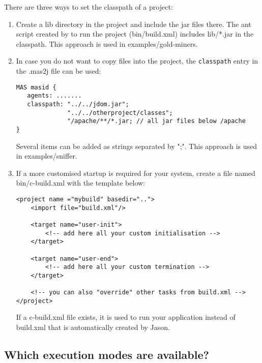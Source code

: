 \documentclass{article}
\newcommand{\jason}[0]{\htlink{\textit{Jason}}{http://jason.sf.net}\xspace}
\begin{document}
There are three ways to set the classpath of a project:
\begin{enumerate}
\item Create a lib directory in the project and include the jar files
  there. The ant script created by \jason to run the project
  (bin/build.xml) includes lib/*.jar in the classpath. This approach
  is used in examples/gold-miners.

\item In case you do not want to copy files into the project, the
  \texttt{classpath} entry in the .mas2j file can be used:
\begin{verbatim}
MAS masid {
   agents: .......
   classpath: "../../jdom.jar"; 
              "../../otherproject/classes";
              "/apache/**/*.jar; // all jar files below /apache
}
\end{verbatim}
  Several items can be added as strings separated by ";". This
  approach is used in examples/sniffer.

\item If a more customised startup is required for your system, create
  a file named bin/c-build.xml with the template below:

\begin{verbatim}
<project name ="mybuild" basedir="..">
    <import file="build.xml"/>
	
    <target name="user-init">
        <!-- add here all your custom initialisation -->
    </target>
	
    <target name="user-end">
        <!-- add here all your custom termination -->
    </target>

    <!-- you can also "override" other tasks from build.xml -->
</project>
\end{verbatim}
  If a c-build.xml file exists, it is used to run your application
  instead of build.xml that is automatically created by Jason.
\end{enumerate}

\subsection{Which execution modes are available?}
\end{document}
